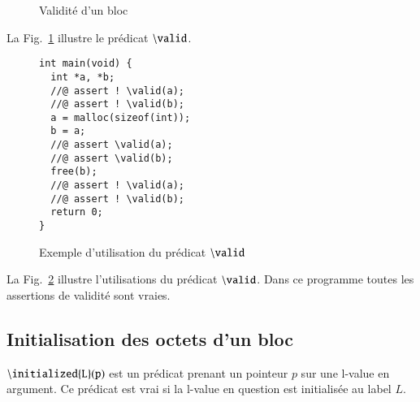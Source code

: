 \documentclass[french]{spimufcphdthesis}
\begin{document}
\begin{figure}[h]
  \begin{center}
  \end{center}
  \caption{Validité d'un bloc}
  \label{fig:valid}
\end{figure}

La Fig.~\ref{fig:valid} illustre le prédicat ${\tt \backslash valid}$.

\begin{figure}[h]
\begin{lstlisting}
int main(void) {
  int *a, *b;
  //@ assert ! \valid(a);
  //@ assert ! \valid(b);
  a = malloc(sizeof(int));
  b = a;
  //@ assert \valid(a);
  //@ assert \valid(b);
  free(b);
  //@ assert ! \valid(a);
  //@ assert ! \valid(b);
  return 0;
}
\end{lstlisting}
\caption{Exemple d'utilisation du prédicat ${\tt \backslash valid}$}
\label{fig:valid-example}
\end{figure}

La Fig.~\ref{fig:valid-example} illustre l'utilisations du prédicat
${\tt \backslash valid}$. Dans ce programme toutes les assertions de validité
sont vraies.


\subsection{Initialisation des octets d'un bloc}

${\tt \backslash initialized\{L\}(p)}$ est un prédicat prenant un pointeur $p$
sur une l-value en argument. Ce prédicat est vrai si la l-value en question est
initialisée au label $L$.
\end{document}
